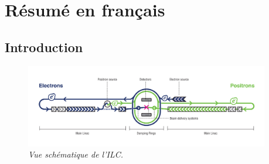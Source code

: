 \section{R\'esum\'e en fran\c cais}
\subsection*{Introduction}
\begin{figure}
	{\centering
		\includegraphics[width=0.95\textwidth]{graphics/ILC_scheme.jpg}
		\caption{\sl Vue sch\'ematique de l'ILC.}
		\label{fig:ILCSchemeF}
	}
\end{figure}

